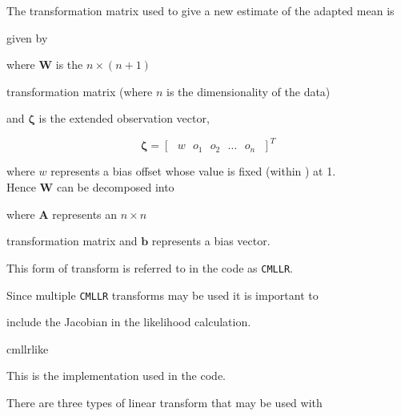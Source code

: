 The transformation matrix used to give a new estimate of the adapted mean is


given by




where $\bm{W}$ is the $n \times \left( n + 1 \right)$


transformation matrix (where $n$ is the dimensionality of the data)


and $\bm{\zeta}$ is the extended observation vector,


\[


        \bm{\zeta} = \left[\mbox{ }w\mbox{ }o_1\mbox{ }o_2\mbox{ }\dots\mbox{ }o_n\mbox{ }\right]^T


\]


where $w$ represents a bias offset whose value is fixed (within \HTK) at 1.\\


Hence $\bm{W}$ can be decomposed into




where $\bm{A}$ represents an $n \times n$


transformation matrix and $\bm{b}$ represents a bias vector.


This form of transform is referred to in the code as {\tt CMLLR}.





Since multiple \texttt{CMLLR} transforms may be used it is important to 


include the Jacobian in the likelihood calculation. 


 {cmllrlike}


This is the implementation used in the code.










There are three types of linear transform that may be used with 


